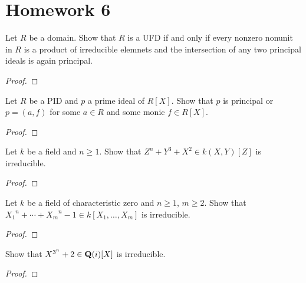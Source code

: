\chapter{Homework 6}
\begin{problem}
Let $R$ be a domain. Show that $R$ is a UFD if and only if every nonzero
nonunit in $R$ is a product of irreducible elemnets and the intersection of
any two principal ideals is again principal.
\end{problem}
\begin{proof}
\end{proof}

\begin{problem}
Let $R$ be a PID and $p$ a prime ideal of $R[X]$. Show that $p$ is
principal or $p=(a,f)$ for some $a\in R$ and some monic $f\in R[X]$.
\end{problem}
\begin{proof}
\end{proof}

\begin{problem}
Let $k$ be a field and $n\geq 1$. Show that $Z^n+Y^3+X^2\in k(X,Y)[Z]$ is
irreducible.
\end{problem}
\begin{proof}
\end{proof}

\begin{problem}
Let $k$ be a field of characteristic zero and $n\geq 1$, $m\geq 2$. Show
that ${X_1}^n+\dotsb+{X_m}^n-1\in k[X_1,\dotsc,X_m]$ is irreducible.
\end{problem}
\begin{proof}
\end{proof}

\begin{problem}
Show that $X^{3^n}+2\in\mathbf{Q}(i)[X]$ is irreducible.
\end{problem}
\begin{proof}
\end{proof}

